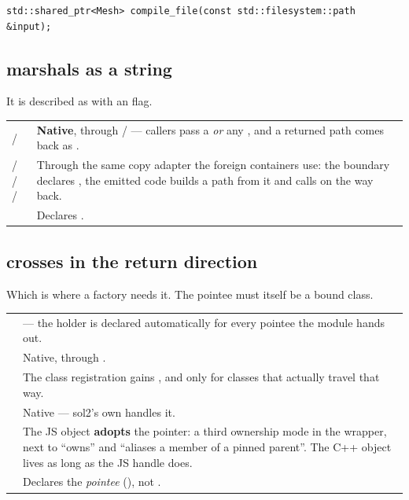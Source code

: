 \begin{lstlisting}[style=cpp]
std::shared_ptr<Mesh> compile_file(const std::filesystem::path &input);
\end{lstlisting}

\subsection*{ marshals as a string}

It is described as  with an  flag.

\begin{center}
\small
\begin{tabular}{@{}lL{9.4cm}@{}}
\toprule
{} /  & \textbf{Native}, through
   /  ---
  callers pass a  \emph{or} any , and a returned
  path comes back as . \\
 /  /  /  & Through the same copy
  adapter the foreign containers use: the boundary declares ,
  the emitted code builds a path from it and calls  on the way
  back. \\
 & Declares . \\
\bottomrule
\end{tabular}
\end{center}

\subsection*{ crosses in the return direction}

Which is where a factory needs it. The pointee  must itself be a bound
class.

\begin{center}
\small
\begin{tabular}{@{}lL{9.4cm}@{}}
\toprule
{} &  --- the holder is
  declared automatically for every pointee the module hands out. \\
 & Native, through . \\
 & The class registration gains
  , and only for classes that
  actually travel that way. \\
 & Native --- sol2's own  handles it. \\
 & The JS object \textbf{adopts} the pointer: a third ownership mode
  in the wrapper, next to ``owns'' and ``aliases a member of a pinned parent''.
  The C++ object lives as long as the JS handle does. \\
 & Declares the \emph{pointee} (), not
  . \\
\bottomrule
\end{tabular}
\end{center}

